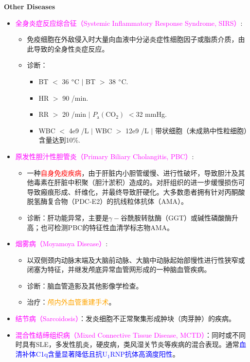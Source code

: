 \documentclass[UTF8]{book}
\newcommand{\concept}[1]{\textcolor{magenta}{#1}}
\newcommand{\drug}[1]{\textcolor{orange}{#1}}
\newcommand{\imp}[1]{\textcolor{red}{#1}}
\renewcommand{\emph}[1]{\textcolor{blue}{#1}}
\begin{document}
\newpage

\textbf{Other Diseases}
\begin{itemize}
\item \concept{全身炎症反应综合征（Systemic Inflammatory Response Syndrome, SIRS）}:
\begin{itemize}
	\item 免疫细胞在外敌侵入时大量向血液中分泌炎症性细胞因子或脂质介质，由此导致的全身性炎症反应。
	\item 诊断：
	\begin{itemize}
		\item BT $<$ 36 $\degree$C $\mid$ BT $>$ 38 $\degree$C.
		\item HR $>$ 90 /min.
		\item RR $>$ 20 /min $\mid$ $P_\mathrm{a}(\mathrm{CO}_2)$ $<$32 mmHg.
		\item WBC $<$ 4e9 /L $\mid$ WBC $>$ 12e9 /L $\mid$ 带状细胞（未成熟中性粒细胞）含量达到10\%.
	\end{itemize}
\end{itemize}
\item \concept{原发性胆汁性胆管炎（Primary Biliary Cholangitis, PBC）}:
\begin{itemize}
	\item 一种\imp{自身免疫疾病}，由于肝脏内小胆管缓慢、进行性破坏，导致胆汁及其他毒素在肝脏中积聚（胆汁淤积）造成的。对肝组织的进一步缓慢损伤可导致瘢痕形成、纤维化，并最终导致肝硬化。大多数患者拥有针对丙酮酸脱氢酶复合物（PDC-E2）的抗线粒体抗体（AMA）。
	\item 诊断：肝功能异常，主要是$\gamma-$谷酰胺转肽酶（GGT）或碱性磷酸酶升高；也可检测PBC的特征性血清学标志物AMA。
\end{itemize}
\item \concept{烟雾病（Moyamoya Disease）}:
\begin{itemize}
	\item 以双侧颈内动脉末端及大脑前动脉、大脑中动脉起始部慢性进行性狭窄或闭塞为特征，并继发颅底异常血管网形成的一种脑血管疾病。
	\item 诊断：脑血管造影及其他影像学检查。
	\item 治疗：\drug{颅内外血管重建手术}。
\end{itemize}
\item \concept{结节病（Sarcoidosis）}：发炎细胞不正常聚集形成肿块（肉芽肿）的疾病。
\item \concept{混合性结缔组织病（Mixed Connective Tissue Disease, MCTD）}：同时或不同时具有SLE，多发性肌炎，硬皮病，类风湿关节炎等疾病的混合表现。通常\emph{血清补体C1q含量显著降低且抗U$_1$RNP抗体高滴度阳性}。
\end{itemize}
\end{document}
